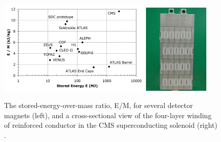 \begin{figure}
\centering
\includegraphics[width=0.65\textwidth]{figures/lhc_and_cms/solenoid_energyOverMass_vs_mass.png}
\hspace{5 mm}
\includegraphics[width=0.28\textwidth]{figures/lhc_and_cms/solenoid_cross_section.png}
\caption{The stored-energy-over-mass ratio, E/M, for several detector magnets (left), and a cross-sectional view of the four-layer winding of reinforced conductor in the CMS superconducting solenoid (right) \cite{cms_experiment}.}
\label{solenoid_figures}
\end{figure}